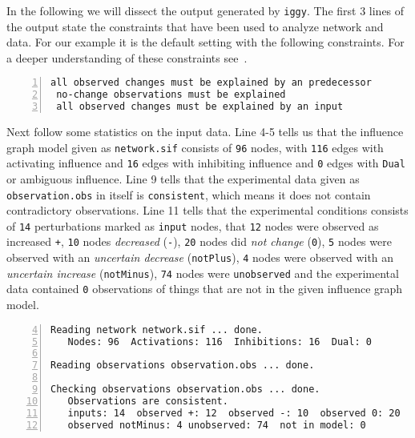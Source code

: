 \documentclass{article}
\newcommand\iggy{\texttt{iggy}}
\begin{document}
In the following we will dissect the output generated by \iggy.
The first 3 lines of the output state the constraints that have been used to analyze network and data.
For our example it is the default setting with the following constraints.
For a deeper understanding of these constraints see~\cite{sthiele15}.

\begin{Verbatim}[frame=single,numbers=left]
 all observed changes must be explained by an predecessor
 no-change observations must be explained
 all observed changes must be explained by an input
\end{Verbatim}

Next follow some statistics on the input data. 
Line 4-5 tells us that the influence graph model given as \texttt{network.sif} 
consists of \texttt{96} nodes, 
with \texttt{116} edges with activating influence 
and \texttt{16} edges with inhibiting influence
and \texttt{0} edges with \texttt{Dual} or ambiguous influence.
%
Line 9 tells that the experimental data given as \texttt{observation.obs} in itself is \texttt{consistent},
which means it does not contain contradictory observations.
Line 11 tells that the experimental conditions consists of \texttt{14} perturbations marked as \texttt{input} nodes, 
that \texttt{12} nodes were observed as increased \texttt{+}, 
\texttt{10} nodes \emph{decreased} (\texttt{-}),
\texttt{20} nodes did \emph{not change} (\texttt{0}),
\texttt{5} nodes were observed with an \emph{uncertain decrease} (\texttt{notPlus}),
\texttt{4} nodes were observed with an \emph{uncertain increase} (\texttt{notMinus}),
\texttt{74} nodes were \texttt{unobserved} and the experimental data contained \texttt{0} observations of things that are not in the given influence graph model.

\begin{Verbatim}[frame=single,numbers=left,firstnumber=4] 
Reading network network.sif ... done.
   Nodes: 96  Activations: 116  Inhibitions: 16  Dual: 0

Reading observations observation.obs ... done.

Checking observations observation.obs ... done.
   Observations are consistent.
   inputs: 14  observed +: 12  observed -: 10  observed 0: 20  observed notPlus: 5  
   observed notMinus: 4 unobserved: 74  not in model: 0
\end{Verbatim}
\end{document}
